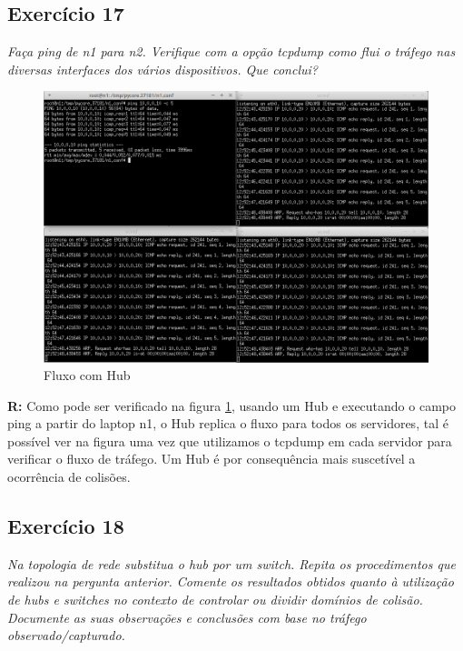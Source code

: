 \documentclass{llncs}
\begin{document}
\subsection{Exercício 17}
\emph{Faça ping de n1 para n2. Verifique com a opção tcpdump como flui o tráfego
nas diversas interfaces dos vários dispositivos. Que conclui?}

\begin{figure}[H]
\begin{center}
\includegraphics[scale=0.45]{17_fluxo.png} 
\end{center}
\caption{\label{fig:17_fluxo}Fluxo com Hub}
\end{figure} 
\par
\textbf{R:} Como pode ser verificado na figura \ref{fig:17_fluxo}, usando um Hub e executando o campo ping a partir do laptop n1, o Hub replica o fluxo para todos os servidores, tal é possível ver na figura uma vez que utilizamos o tcpdump em cada servidor para verificar o fluxo de tráfego. Um Hub é por consequência mais suscetível a ocorrência de colisões.


\subsection{Exercício 18}
\emph{Na topologia de rede substitua o hub por um switch. Repita os procedimentos que
realizou na pergunta anterior. Comente os resultados obtidos quanto à utilização de 
hubs e switches no contexto de controlar ou dividir domínios de colisão. Documente as
suas observações e conclusões com base no tráfego observado/capturado.}
\end{document}

